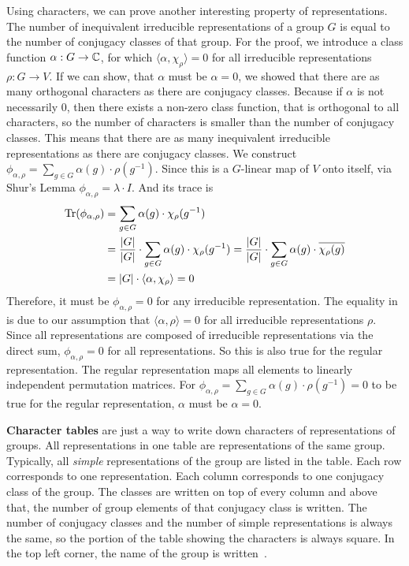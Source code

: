 
Using characters, we can prove another interesting property of representations.
The number of inequivalent irreducible representations of a group $G$ is equal to the number of conjugacy classes of that group.
For the proof, we introduce a class function $\alpha: G \to \mathbb{C}$, for which $\langle \alpha, \chi_\rho \rangle = 0$ for all irreducible representations $\rho: G \to V$.
If we can show, that $\alpha$ must be $\alpha = 0$, we showed that there are as many orthogonal characters as there are conjugacy classes.
Because if $\alpha$ is not necessarily $0$, then there exists a non-zero class function, that is orthogonal to all characters, so the number of characters is smaller than the number of conjugacy classes.
This means that there are as many inequivalent irreducible representations as there are conjugacy classes.
We construct $\phi_{\alpha, \rho} = \sum_{g \in G} \alpha(g) \cdot \rho(g^{-1})$.
Since this is a $G$-linear map of $V$ onto itself, via Shur's Lemma $\phi_{\alpha, \rho} = \lambda \cdot I$.
And its trace is
\begin{subequations}
\begin{align}
    \operatorname{Tr}(\phi_{\alpha, \rho}) & = \sum_{g \in G} \alpha(g) \cdot \chi_\rho(g^{-1}) \\
    & = \dfrac{|G|}{|G|} \cdot \sum_{g \in G} \alpha(g) \cdot \chi_\rho(g^{-1})
    = \dfrac{|G|}{|G|} \cdot \sum_{g \in G} \alpha(g) \cdot \overline{\chi_\rho(g)} \\
    & = |G| \cdot \langle \alpha, \chi_\rho \rangle = 0 \label{equ:numirr.numconj.last}
\end{align}
\end{subequations}
Therefore, it must be $\phi_{\alpha, \rho} = 0$ for any irreducible representation.
The equality in  is due to our assumption that $\langle \alpha, \rho \rangle = 0$ for all irreducible representations $\rho$.
Since all representations are composed of irreducible representations via the direct sum, $\phi_{\alpha, \rho} = 0$ for all representations.
So this is also true for the regular representation.
The regular representation maps all elements to linearly independent permutation matrices.
For $\phi_{\alpha, \rho} = \sum_{g \in G} \alpha(g) \cdot \rho(g^{-1}) = 0$ to be true for the regular representation, $\alpha$ must be $\alpha = 0$.

\textbf{Character tables} are just a way to write down characters of representations of groups.
All representations in one table are representations of the same group.
Typically, all \textit{simple} representations of the group are listed in the table.
Each row corresponds to one representation.
Each column corresponds to one conjugacy class of the group.
The classes are written on top of every column and above that, the number of group elements of that conjugacy class is written.
The number of conjugacy classes and the number of simple representations is always the same, so the portion of the table showing the characters is always square.
In the top left corner, the name of the group is written~\cite{fulton2013}.
